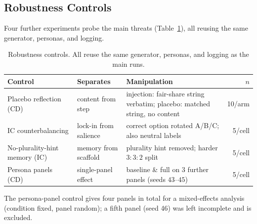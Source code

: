 \documentclass[runningheads]{llncs}
\begin{document}
\subsection{Robustness Controls}\label{sec:controls}
Four further experiments probe the main threats (Table~\ref{tab:controls}), all reusing the same
generator, personas, and logging.
\begin{table}[t]
\centering
\caption{Robustness controls. All reuse the same generator, personas, and logging as the main runs.}
\label{tab:controls}
\small
\setlength{\tabcolsep}{4pt}
\begin{tabular}{@{}p{2.1cm} p{2.0cm} p{6.4cm} r@{}}
\toprule
Control & Separates & Manipulation & $n$ \\
\midrule
Placebo reflection (CD) & content from step & injection: fair-share string verbatim; placebo: matched string, no content & 10/arm \\
IC counterbalancing & lock-in from salience & correct option rotated A/B/C; also neutral labels & 5/cell \\
No-plurality-hint memory (IC) & memory from scaffold & plurality hint removed; harder $3{:}3{:}2$ split & 5/cell \\
Persona panels (CD) & single-panel effect & baseline \& full on 3 further panels (seeds $43$--$45$) & 5/cell \\
\bottomrule
\end{tabular}
\end{table}
The persona-panel control gives four panels in total for a mixed-effects analysis (condition
fixed, panel random); a fifth panel (seed 46) was left incomplete and is excluded.
\end{document}
